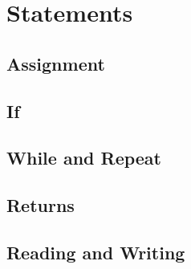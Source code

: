 \section{Statements}
\subsection{Assignment}
\subsection{If}
\subsection{While and Repeat}
\subsection{Returns}
\subsection{Reading and Writing}
